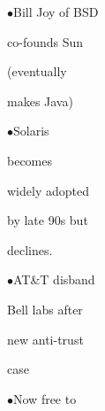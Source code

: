 \documentclass[a4paper,portrait,12pt]{article}
\begin{document}
\begin{flushleft}
$\bullet$Bill Joy of BSD
\end{flushleft}


\begin{flushleft}
co-founds Sun
\end{flushleft}


\begin{flushleft}
(eventually
\end{flushleft}


\begin{flushleft}
makes Java)
\end{flushleft}


\begin{flushleft}
$\bullet$Solaris
\end{flushleft}


\begin{flushleft}
becomes
\end{flushleft}


\begin{flushleft}
widely adopted
\end{flushleft}


\begin{flushleft}
by late 90s but
\end{flushleft}


\begin{flushleft}
declines.
\end{flushleft}










\begin{flushleft}
$\bullet$AT\&T disband
\end{flushleft}


\begin{flushleft}
Bell labs after
\end{flushleft}


\begin{flushleft}
new anti-trust
\end{flushleft}


\begin{flushleft}
case
\end{flushleft}


\begin{flushleft}
$\bullet$Now free to
\end{flushleft}
\end{document}
